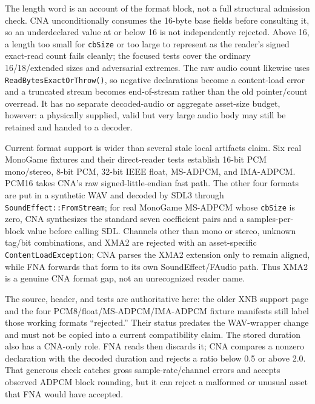 The length word is an account of the format block, not a full structural admission check. CNA
unconditionally consumes the 16-byte base fields before consulting it, so an underdeclared value
at or below 16 is not independently rejected. Above 16, a length too small for \texttt{cbSize} or
too large to represent as the reader's signed exact-read count fails cleanly; the focused tests
cover the ordinary 16/18/extended sizes and adversarial extremes. The raw audio count likewise
uses \texttt{ReadBytesExactOrThrow()}, so negative declarations become a content-load error and a
truncated stream becomes end-of-stream rather than the old pointer/count overread. It has no
separate decoded-audio or aggregate asset-size budget, however: a physically supplied, valid but
very large audio body may still be retained and handed to a decoder.

Current format support is wider than several stale local artifacts claim. Six real MonoGame
fixtures and their direct-reader tests establish 16-bit PCM mono/stereo, 8-bit PCM, 32-bit IEEE
float, MS-ADPCM, and IMA-ADPCM. PCM16 takes CNA's raw signed-little-endian fast path. The other
four formats are put in a synthetic WAV and decoded by SDL3 through \texttt{SoundEffect::FromStream};
for real MonoGame MS-ADPCM whose \texttt{cbSize} is zero, CNA synthesizes the standard seven
coefficient pairs and a samples-per-block value before calling SDL. Channels other than mono or
stereo, unknown tag/bit combinations, and XMA2 are rejected with an asset-specific
\texttt{ContentLoadException}; CNA parses the XMA2 extension only to remain aligned, while FNA
forwards that form to its own SoundEffect/FAudio path. Thus XMA2 is a genuine CNA format gap, not
an unrecognized reader name.

The source, header, and tests are authoritative here: the older XNB support page and the four
PCM8/float/MS-ADPCM/IMA-ADPCM fixture manifests still label those working formats ``rejected.''
Their status predates the WAV-wrapper change and must not be copied into a current compatibility
claim. The stored duration also has a CNA-only role. FNA reads then discards it; CNA compares a
nonzero declaration with the decoded duration and rejects a ratio below 0.5 or above 2.0. That
generous check catches gross sample-rate/channel errors and accepts observed ADPCM block rounding,
but it can reject a malformed or unusual asset that FNA would have accepted.

